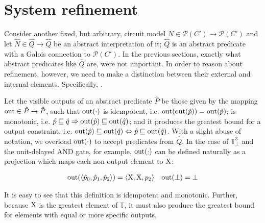 \section{System refinement}

Consider another fixed, but arbitrary, circuit model $N \in \mathcal{P}(C') \rightarrow \mathcal{P}(C')$ and let $\hat N \in \hat Q \rightarrow \hat Q$ be an abstract interpretation of it; $\hat Q$ is an abstract predicate with a Galois connection to $\mathcal{P}(C')$. In the previous sections, exactly what abstract predicates like $\hat Q$ are, were not important. In order to reason about refinement, however, we need to make a distinction between their external and internal elements. Specifically, .

Let the visible outputs of an abstract predicate $\hat P$ be those given by the mapping $\operatorname{out} \in \hat P \rightarrow \hat P$, such that $\operatorname{out}(\cdot)$ is idempotent, i.e. $\operatorname{out}(\operatorname{out}(\hat p)) = \operatorname{out}(\hat p)$; is monotonic, i.e. $\hat p \sqsubseteq \hat q \Rightarrow \operatorname{out}(\hat p) \sqsubseteq \operatorname{out}(\hat q)$; and it produces the greatest bound for a output constraint, i.e. $\operatorname{out}(\hat p) \sqsubseteq \operatorname{out}(\hat q) \Leftrightarrow \hat p \sqsubseteq \operatorname{out}(\hat q)$. With a slight abuse of notation, we overload $\operatorname{out}(\cdot)$ to accept predicates from $\hat Q$. In the case of $\mathbb{T}_{\bot}^{3}$ and the unit-delayed AND gate, for example, $\operatorname{out}(\cdot)$ can be defined naturally as a projection which maps each non-output element to $\mathrm{X}$:


\begin{align*}
\operatorname{out}(\langle \hat p_{0}, \hat p_{1}, \hat p_{2} \rangle) = \langle \mathrm{X}, \mathrm{X}, p_{2} \rangle && \operatorname{out}(\bot) = \bot
\end{align*}

\noindent It is easy to see that this definition is idempotent and monotonic. Further, because $\mathrm{X}$ is the greatest element of $\mathbb{T}$, it must also produce the greatest bound for elements with equal or more specific outputs.



